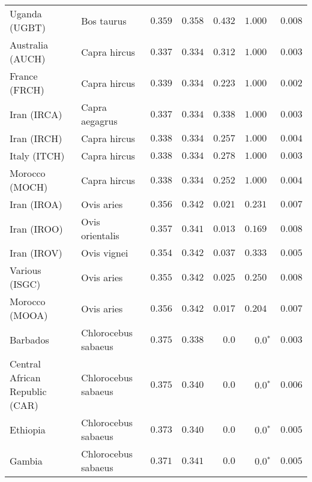 \begin{center}
\begin{adjustbox}{width = 1\textwidth}
\begin{tabular}{|l|l|r|r|r|r|r|}
            Uganda (UGBT)                  & Bos taurus        & $ 0.359$ & $ 0.358$ & $ 0.432$ & $ 1.000~~$        & $ 0.008$ \\
            Australia (AUCH)                    & Capra hircus      & $ 0.337$ & $ 0.334$ & $ 0.312$ & $ 1.000~~$        & $ 0.003$ \\
            France (FRCH)                    & Capra hircus        & $ 0.339$ & $ 0.334$ & $ 0.223$ & $ 1.000~~$        & $ 0.002$ \\
            Iran (IRCA)                   & Capra aegagrus        & $ 0.337$ & $ 0.334$ & $ 0.338$ & $ 1.000~~$        & $ 0.003$ \\
            Iran (IRCH)                 & Capra hircus        & $ 0.338$ & $ 0.334$ & $ 0.257$ & $ 1.000~~$        & $ 0.004$ \\
            Italy (ITCH)                    & Capra hircus          & $ 0.338$ & $ 0.334$ & $ 0.278$ & $ 1.000~~$        & $ 0.003$ \\
            Morocco (MOCH)                    & Capra hircus     & $ 0.338$ & $ 0.334$ & $ 0.252$ & $ 1.000~~$        & $ 0.004$ \\
            Iran (IROA)                    & Ovis aries         & $ 0.356$ & $ 0.342$ & $ 0.021$ & $ 0.231~~$        & $ 0.007$ \\
            Iran (IROO)                 & Ovis orientalis          & $ 0.357$ & $ 0.341$ & $ 0.013$ & $ 0.169~~$        & $ 0.008$ \\
            Iran (IROV)                 & Ovis vignei          & $ 0.354$ & $ 0.342$ & $ 0.037$ & $ 0.333~~$        & $ 0.005$ \\
            Various (ISGC)                       & Ovis aries & $ 0.355$ & $ 0.342$ & $ 0.025$    & $ 0.250~~$    & $ 0.008$ \\
            Morocco (MOOA) & Ovis aries & $ 0.356$ & $ 0.342$ & $ 0.017$    & $ 0.204~~$ & $ 0.007$ \\
            Barbados                       & Chlorocebus sabaeus & $ 0.375$ & $ 0.338$ & $0.0$    & $\bm{0.0{^*}}$    & $ 0.003$ \\
            Central African Republic (CAR)                         & Chlorocebus sabaeus & $ 0.375$ & $ 0.340$ & $0.0$    & $\bm{0.0{^*}}$    & $ 0.006$ \\
            Ethiopia                          & Chlorocebus sabaeus & $ 0.373$ & $ 0.340$ & $0.0$    & $\bm{0.0{^*}}$    & $ 0.005$ \\
            Gambia                          & Chlorocebus sabaeus & $ 0.371$ & $ 0.341$ & $0.0$    & $\bm{0.0{^*}}$    & $ 0.005$ \\

\end{tabular}
\end{adjustbox}
\end{center}
